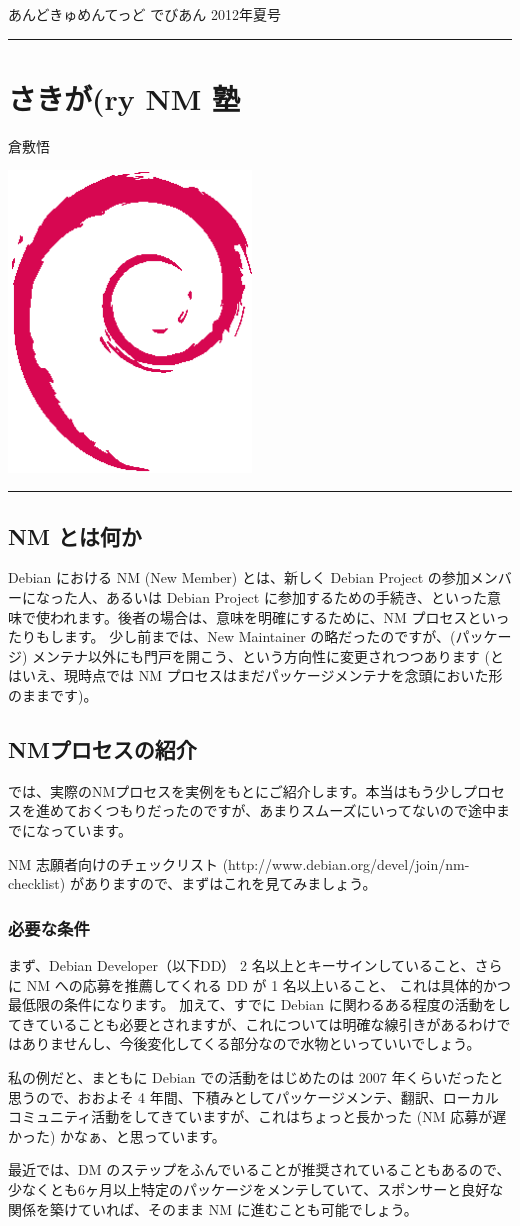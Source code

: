 \documentclass[mingoth,a4paper]{jsarticle}
\renewcommand{\dancersection}[2]{%
\newpage
あんどきゅめんてっど でびあん 2012年夏号
%
\vspace{0.1mm}\\
{\color{dancerdarkblue}\rule{\hsize}{2mm}}

%
%
\begin{minipage}[t]{0.6\hsize}
\color{dancerdarkblue}
\vspace{1cm}
\section{#1}
\hfill{}#2\\
\end{minipage}
\begin{minipage}[t]{0.4\hsize}
\vspace{-2cm}
\hfill{}\includegraphics[height=8cm]{image200502/openlogo-nd.eps}\\
\vspace{-5cm}
\end{minipage}
%
{\color{dancerlightblue}\rule{0.66\hsize}{2mm}}
%
\vspace{2cm}
}
\begin{document}
\clearpage

\dancersection{さきが(ry NM 塾}{倉敷悟}

\subsection{NM とは何か}

Debian における NM (New Member) とは、新しく Debian Project の参加メンバーになった人、あるいは Debian Project
に参加するための手続き、といった意味で使われます。後者の場合は、意味を明確にするために、NM プロセスといったりもします。
少し前までは、New Maintainer の略だったのですが、(パッケージ) メンテナ以外にも門戸を開こう、という方向性に変更されつつあります
(とはいえ、現時点では NM プロセスはまだパッケージメンテナを念頭においた形のままです)。

\subsection{NMプロセスの紹介}

では、実際のNMプロセスを実例をもとにご紹介します。本当はもう少しプロセスを進めておくつもりだったのですが、あまりスムーズにいってないので途中までになっています。

NM 志願者向けのチェックリスト (http://www.debian.org/devel/join/nm-checklist) がありますので、まずはこれを見てみましょう。

\subsubsection{必要な条件}

まず、Debian Developer（以下DD） 2 名以上とキーサインしていること、さらに NM への応募を推薦してくれる DD が 1 名以上いること、
これは具体的かつ最低限の条件になります。
加えて、すでに Debian に関わるある程度の活動をしてきていることも必要とされますが、これについては明確な線引きがあるわけではありませんし、今後変化してくる部分なので水物といっていいでしょう。

私の例だと、まともに Debian での活動をはじめたのは 2007 年くらいだったと思うので、おおよそ 4 年間、下積みとしてパッケージメンテ、翻訳、ローカルコミュニティ活動をしてきていますが、これはちょっと長かった (NM 応募が遅かった) かなぁ、と思っています。

最近では、DM のステップをふんでいることが推奨されていることもあるので、少なくとも6ヶ月以上特定のパッケージをメンテしていて、スポンサーと良好な関係を築けていれば、そのまま NM に進むことも可能でしょう。
\end{document}
